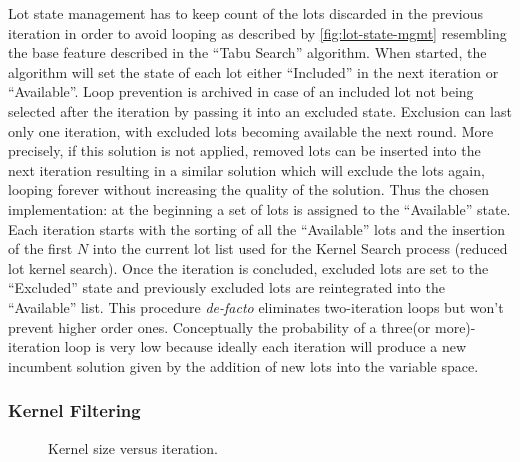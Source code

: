 \documentclass[a4paper, twocolumn, oneside, 10pt]{article}
\begin{document}
Lot state management has to keep count of the lots discarded in the previous iteration in order to avoid looping as described by \cref{fig:lot-state-mgmt} resembling the base feature described in the ``Tabu Search'' algorithm\cite{glover1990tabu}. When started, the algorithm will set the state of each lot either ``Included'' in the next iteration or ``Available''. Loop prevention is archived in case of an included lot not being selected after the iteration by passing it into an excluded state.
Exclusion can last only one iteration, with excluded lots becoming available the next round.
More precisely, if this solution is not applied, removed lots can be inserted into the next iteration resulting in a similar solution which will exclude the lots again, looping forever without increasing the quality of the solution. 
Thus the chosen implementation: at the beginning a set of lots is assigned to the ``Available'' state. Each iteration starts with the sorting of all the ``Available'' lots and the insertion of the first \(N\) into the current lot list used for the Kernel Search process (reduced lot kernel search). Once the iteration is concluded, excluded lots are set to the ``Excluded'' state and previously excluded lots are reintegrated into the ``Available'' list. 
This procedure \textit{de-facto} eliminates two-iteration loops but won't prevent higher order ones. Conceptually the probability of a three(or more)-iteration loop is very low because ideally each iteration will produce a new incumbent solution given by the addition of new lots into the variable space.


\subsubsection{Kernel Filtering}\label{sec:kernel-filtering}

\begin{figure}
	\centering
	\caption{Kernel size versus iteration.}\label{fig:ksize-filtering}
\end{figure}
\end{document}
